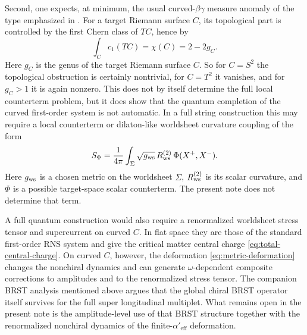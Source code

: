 \documentclass[11pt]{article}
\newcommand{\Aeff}{\alpha'_{\mathrm{eff}}}
\begin{document}
Second, one expects, at minimum, the usual curved-$\beta\gamma$ measure anomaly of the type emphasized in \cite{nekrasov2005curvedbetagammasystems}. For a target Riemann surface $C$, its topological part is controlled by the first Chern class of $TC$, hence by
\begin{equation}\label{eq:target-euler}
\int_C c_1(TC)=\chi(C)=2-2g_C.
\end{equation}
Here $g_C$ is the genus of the target Riemann surface $C$. So for $C=S^2$ the topological obstruction is certainly nontrivial, for $C=T^2$ it vanishes, and for $g_C>1$ it is again nonzero. This does not by itself determine the full local counterterm problem, but it does show that the quantum completion of the curved first-order system is not automatic. In a full string construction this may require a local counterterm or dilaton-like worldsheet curvature coupling of the form
\begin{equation}\label{eq:dilaton-like-coupling}
S_\Phi=\frac{1}{4\pi}\int_\Sigma \sqrt{g_{\rm ws}}\,R^{(2)}_{\rm ws}\,\Phi(X^+,X^-).
\end{equation}
Here $g_{\rm ws}$ is a chosen metric on the worldsheet $\Sigma$, $R^{(2)}_{\rm ws}$ is its scalar curvature, and $\Phi$ is a possible target-space scalar counterterm. The present note does not determine that term.

A full quantum construction would also require a renormalized worldsheet stress tensor and supercurrent on curved $C$. In flat space they are those of the standard first-order RNS system and give the critical matter central charge \eqref{eq:total-central-charge}. On curved $C$, however, the deformation \eqref{eq:metric-deformation} changes the nonchiral dynamics and can generate $\omega$-dependent composite corrections to amplitudes and to the renormalized stress tensor. The companion BRST analysis mentioned above argues that the global chiral BRST operator itself survives for the full super longitudinal multiplet. What remains open in the present note is the amplitude-level use of that BRST structure together with the renormalized nonchiral dynamics of the finite-$\Aeff$ deformation.
\end{document}

